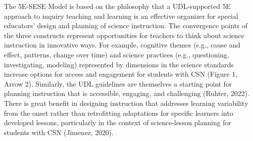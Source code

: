 \documentclass[11.5pt]{sig-alternate} %
\begin{document}
\begin{large}
The 5E-SESE Model is based on the philosophy that a UDL-supported 5E approach to inquiry teaching and learning is an effective organizer for special educators’ design and planning of science instruction. The convergence points of the three constructs represent opportunities for teachers to think about science instruction in innovative ways. For example, cognitive themes (e.g., cause and effect, patterns, change over time) and science practices (e.g., questioning, investigating, modeling) represented by dimensions in the science standards increase options for access and engagement for students with CSN (Figure 1, Arrow 2). Similarly, the UDL guidelines are themselves a starting point for planning instruction that is accessible, engaging, and challenging (Ruhter, 2022). There is great benefit in designing instruction that addresses learning variability from the onset rather than retrofitting adaptations for specific learners into developed lessons, particularly in the context of science-lesson planning for students with CSN (Jimenez, 2020).


\end{large}
\end{document}
